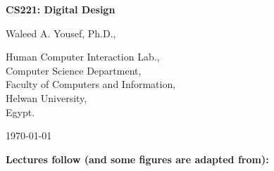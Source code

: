 \begin{titlingpage}
\begin{center}
\vspace*{1in}

\textbf{\large CS221: Digital Design}


\bigskip

\vspace*{1in}

Waleed A. Yousef, Ph.D.,

\bigskip

Human Computer Interaction Lab.,\\Computer Science Department,\\Faculty of Computers and Information,\\Helwan University,\\Egypt.

\bigskip

\today

\end{center}
\end{titlingpage}


\textbf{Lectures follow (and some figures are adapted from):}

\bigskip

\begin{window}
\end{window}




